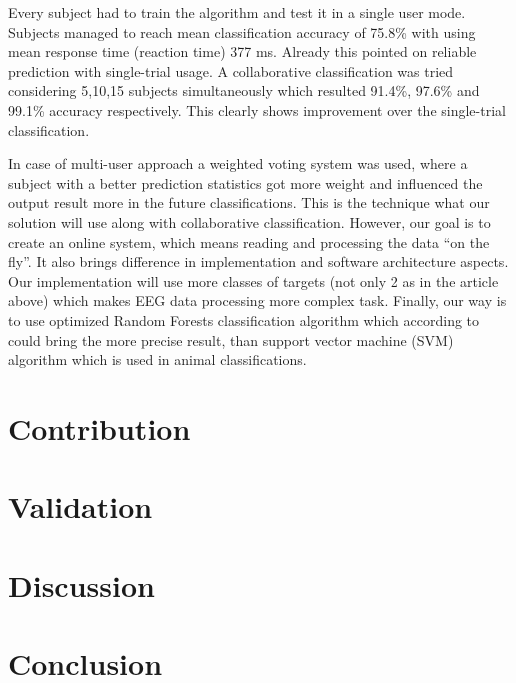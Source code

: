\documentclass[12pt]{article}
\begin{document}
Every subject had to train the algorithm and test it in a single user mode. Subjects managed to reach mean classification accuracy of 75.8\% with using mean response time (reaction time) 377 ms. Already this pointed on reliable prediction with single-trial usage. A collaborative classification was tried considering 5,10,15 subjects simultaneously which resulted 91.4\%, 97.6\% and 99.1\% accuracy respectively. This clearly shows improvement over the single-trial classification. 

In case of multi-user approach a weighted voting system was used, where a subject with a better prediction statistics got more weight and influenced the output result more in the future classifications. This is the technique what our solution will use along with collaborative classification. However, our goal is to create an online system, which means reading and processing the data ``on the fly''. It also brings difference in implementation and software architecture aspects. Our implementation will use more classes of targets (not only 2 as in the article above) which makes EEG data processing more complex task. Finally, our way is to use optimized Random Forests classification algorithm which according to \cite{masso} could bring the more precise result, than support vector machine (SVM) algorithm which is used in animal classifications.

\newpage
\section{Contribution}

\newpage
\section{Validation}

\newpage
\section{Discussion}

\newpage
\section{Conclusion}
\end{document}
